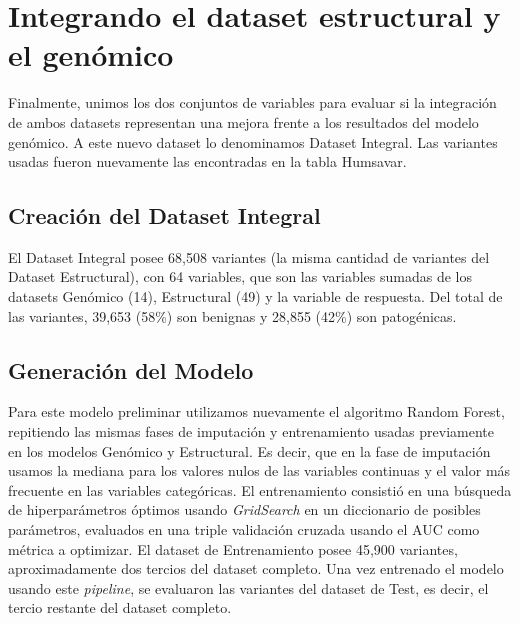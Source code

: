 \newpage


\section{Integrando el dataset estructural y el genómico}

Finalmente, unimos los dos conjuntos de variables para evaluar si la integración de ambos datasets representan una mejora frente a los resultados del modelo genómico. A este nuevo dataset lo denominamos Dataset Integral. Las variantes usadas fueron nuevamente las encontradas en la tabla Humsavar. 

\subsection{Creación del Dataset Integral}

El Dataset Integral posee 68,508 variantes (la misma cantidad de variantes del Dataset Estructural), con 64 variables, que son las variables sumadas de los datasets Genómico (14), Estructural (49) y la variable de respuesta. Del total de las variantes, 39,653 (58\%) son benignas y 28,855 (42\%) son patogénicas. 

\subsection{Generación del Modelo}

Para este modelo preliminar utilizamos nuevamente el algoritmo Random Forest, repitiendo las mismas fases de imputación y entrenamiento usadas previamente en los modelos Genómico y Estructural. Es decir, que en la fase de imputación usamos la mediana para los valores nulos de las variables continuas y el valor más frecuente en las variables categóricas. El entrenamiento consistió en una búsqueda de hiperparámetros óptimos usando \textit{GridSearch} en un diccionario de posibles parámetros, evaluados en una triple validación cruzada usando el AUC como métrica a optimizar. El dataset de Entrenamiento posee 45,900 variantes, aproximadamente dos tercios del dataset completo. Una vez entrenado el modelo usando este \textit{pipeline}, se evaluaron las variantes del dataset de Test, es decir, el tercio restante del dataset completo.

